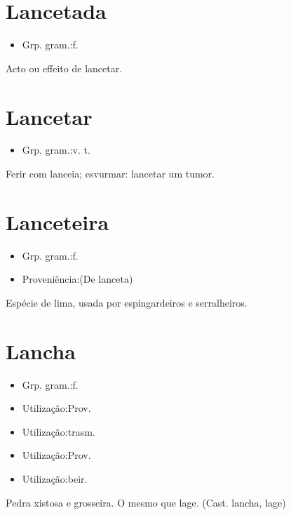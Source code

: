 \section{Lancetada}
\begin{itemize}
\item {Grp. gram.:f.}
\end{itemize}
Acto ou effeito de lancetar.
\section{Lancetar}
\begin{itemize}
\item {Grp. gram.:v. t.}
\end{itemize}
Ferir com lanceia; esvurmar: \textunderscore lancetar um tumor\textunderscore .
\section{Lanceteira}
\begin{itemize}
\item {Grp. gram.:f.}
\end{itemize}
\begin{itemize}
\item {Proveniência:(De \textunderscore lanceta\textunderscore )}
\end{itemize}
Espécie de lima, usada por espingardeiros e serralheiros.
\section{Lancha}
\begin{itemize}
\item {Grp. gram.:f.}
\end{itemize}
\begin{itemize}
\item {Utilização:Prov.}
\end{itemize}
\begin{itemize}
\item {Utilização:trasm.}
\end{itemize}
\begin{itemize}
\item {Utilização:Prov.}
\end{itemize}
\begin{itemize}
\item {Utilização:beir.}
\end{itemize}
Pedra xistosa e grosseira.
O mesmo que \textunderscore lage\textunderscore .
(Cast. \textunderscore lancha\textunderscore , lage)
